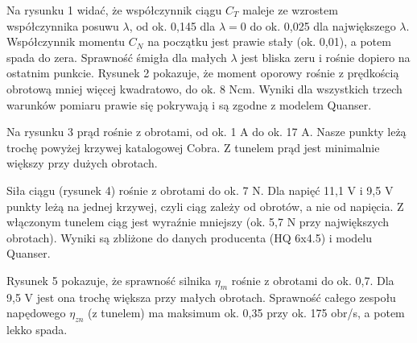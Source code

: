 \vfill
{}
\akapit Na rysunku 1 widać, że współczynnik ciągu $C_T$ maleje ze wzrostem współczynnika posuwu $\lambda$, od ok. 0,145 dla $\lambda = 0$ do ok. 0,025 dla największego $\lambda$. Współczynnik momentu $C_N$ na początku jest prawie stały (ok. 0,01), a potem spada do zera. Sprawność śmigła dla małych $\lambda$ jest bliska zeru i rośnie dopiero na ostatnim punkcie.
\vfill\newpage
{}
\akapit Rysunek 2 pokazuje, że moment oporowy rośnie z prędkością obrotową mniej więcej kwadratowo, do ok. 8 Ncm. Wyniki dla wszystkich trzech warunków pomiaru prawie się pokrywają i są zgodne z modelem Quanser.

\vfill\newpage
{}
\akapit Na rysunku 3 prąd rośnie z obrotami, od ok. 1 A do ok. 17 A. Nasze punkty leżą trochę powyżej krzywej katalogowej Cobra. Z tunelem prąd jest minimalnie większy przy dużych obrotach.

\vfill\newpage
{}
\akapit Siła ciągu (rysunek 4) rośnie z obrotami do ok. 7 N. Dla napięć 11,1 V i 9,5 V punkty leżą na jednej krzywej, czyli ciąg zależy od obrotów, a nie od napięcia. Z włączonym tunelem ciąg jest wyraźnie mniejszy (ok. 5,7 N przy największych obrotach). Wyniki są zbliżone do danych producenta (HQ 6x4.5) i modelu Quanser.

\vfill\newpage
{}
\akapit Rysunek 5 pokazuje, że sprawność silnika $\eta_m$ rośnie z obrotami do ok. 0,7. Dla 9,5 V jest ona trochę większa przy małych obrotach. Sprawność całego zespołu napędowego $\eta_{zn}$ (z tunelem) ma maksimum ok. 0,35 przy ok. 175 obr/s, a potem lekko spada.
\vfill\newpage
